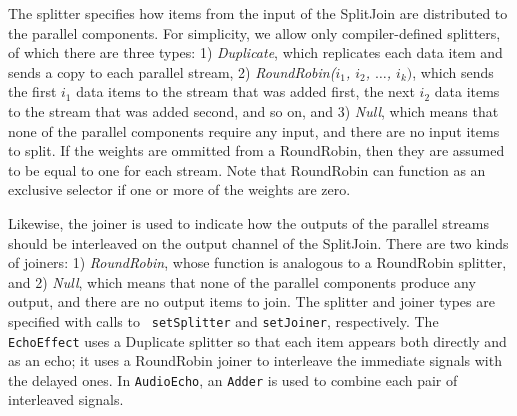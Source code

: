 The splitter specifies how items from the input of the SplitJoin are
distributed to the parallel components.  For simplicity, we allow only
compiler-defined splitters, of which there are three types: 1) {\it
Duplicate}, which replicates each data item and sends a copy to each
parallel stream, 2) {\it RoundRobin($i_1$, $i_2$, $\dots$, $i_k)$},
which sends the first $i_1$ data items to the stream that was added
first, the next $i_2$ data items to the stream that was added second,
and so on, and 3) {\it Null}, which means that none of the parallel
components require any input, and there are no input items to split.  If
the weights are ommitted from a RoundRobin, then they are assumed to be
equal to one for each stream.  Note that RoundRobin can function as an
exclusive selector if one or more of the weights are zero.

Likewise, the joiner is used to indicate how the outputs of the parallel
streams should be interleaved on the output channel of the SplitJoin.
There are two kinds of joiners: 1) {\it RoundRobin}, whose function is
analogous to a RoundRobin splitter, and 2) {\it Null}, which means that
none of the parallel components produce any output, and there are no
output items to join.
The splitter and joiner types are specified with calls to {\tt
setSplitter} and {\tt setJoiner}, respectively.  The {\tt EchoEffect}
uses a Duplicate splitter so that each item appears both directly and as
an echo; it uses a RoundRobin joiner to interleave the immediate signals
with the delayed ones.  In {\tt AudioEcho}, an {\tt Adder} is used to
combine each pair of interleaved signals.

